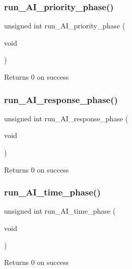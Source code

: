 \subsubsection{\texorpdfstring{run\+\_\+\+A\+I\+\_\+priority\+\_\+phase()}{run\_AI\_priority\_phase()}}
{\footnotesize\ttfamily unsigned int run\+\_\+\+A\+I\+\_\+priority\+\_\+phase (\begin{DoxyParamCaption}\item[{void}]{ }\end{DoxyParamCaption})}

\begin{DoxyReturn}{Returns}
0 on success 
\end{DoxyReturn}
\mbox{\label{group__phase__functions_ga0a0b5f5f0651f624b53940e999c7cbb9}} 
\subsubsection{\texorpdfstring{run\+\_\+\+A\+I\+\_\+response\+\_\+phase()}{run\_AI\_response\_phase()}}
{\footnotesize\ttfamily unsigned int run\+\_\+\+A\+I\+\_\+response\+\_\+phase (\begin{DoxyParamCaption}\item[{void}]{ }\end{DoxyParamCaption})}

\begin{DoxyReturn}{Returns}
0 on success 
\end{DoxyReturn}
\mbox{\label{group__phase__functions_ga03f61084843501f07105ba840b4ca344}} 
\subsubsection{\texorpdfstring{run\+\_\+\+A\+I\+\_\+time\+\_\+phase()}{run\_AI\_time\_phase()}}
{\footnotesize\ttfamily unsigned int run\+\_\+\+A\+I\+\_\+time\+\_\+phase (\begin{DoxyParamCaption}\item[{void}]{ }\end{DoxyParamCaption})}

\begin{DoxyReturn}{Returns}
0 on success 
\end{DoxyReturn}
